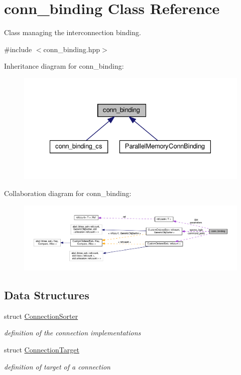 \hypertarget{classconn__binding}{}\section{conn\+\_\+binding Class Reference}
\label{classconn__binding}


Class managing the interconnection binding.  




{\ttfamily \#include $<$conn\+\_\+binding.\+hpp$>$}



Inheritance diagram for conn\+\_\+binding\+:
\nopagebreak
\begin{figure}[H]
\begin{center}
\leavevmode
\includegraphics[width=328pt]{d8/d09/classconn__binding__inherit__graph}
\end{center}
\end{figure}


Collaboration diagram for conn\+\_\+binding\+:
\nopagebreak
\begin{figure}[H]
\begin{center}
\leavevmode
\includegraphics[width=350pt]{d6/db7/classconn__binding__coll__graph}
\end{center}
\end{figure}
\subsection*{Data Structures}
\begin{DoxyCompactItemize}
\item 
struct \hyperlink{structconn__binding_1_1ConnectionSorter}{Connection\+Sorter}
\begin{DoxyCompactList}\small\item\em definition of the connection implementations \end{DoxyCompactList}\item 
struct \hyperlink{structconn__binding_1_1ConnectionTarget}{Connection\+Target}
\begin{DoxyCompactList}\small\item\em definition of target of a connection \end{DoxyCompactList}\end{DoxyCompactItemize}
